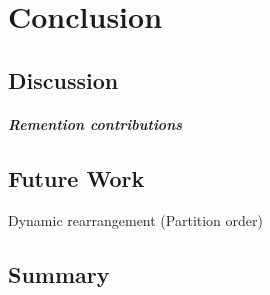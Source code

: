 \chapter{Conclusion}\label{\positionnumber}

\section{Discussion}\label{\positionnumber}
\paragraph{Remention contributions}
\section{Future Work}\label{\positionnumber}
Dynamic rearrangement
(Partition order)


\section{Summary}\label{\positionnumber}
